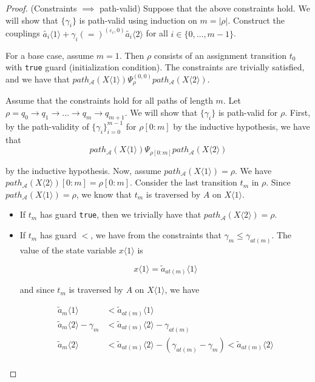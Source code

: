 \documentclass{article}
\renewcommand{\epsilon}{\varepsilon}
\newcommand{\1}{\langle 1 \rangle}
\newcommand{\2}{\langle 2 \rangle}
\begin{document}
\begin{proof}
    (Constraints $\implies$ path-valid) Suppose that the above constraints hold. We will show that $\{\gamma_i\}$ is path-valid using induction on $m = |\rho|$. Construct the couplings $\tilde{a_i} \1 + \gamma_i (=)^{(\epsilon_i, 0)} \tilde{a_i} \2$ for all $i \in \{0, \dots, m - 1\}$. 

    For a base case, assume $m = 1$. Then $\rho$ consists of an assignment transition $t_0$ with \texttt{true} guard (initialization condition). The constraints are trivially satisfied, and we have that $path_{\mathcal{A}}(X \1 ) \Psi_\rho^{(0, 0)} path_{\mathcal{A}}(X \2)$.

    Assume that the constraints hold for all paths of length $m$. Let $\rho = q_0 \to q_1 \to \dots \to q_{m} \to q_{m + 1}$. We will show that $\{\gamma_i\}$ is path-valid for $\rho$. First, by the path-validity of $\{\gamma_i\}_{i = 0}^{m - 1}$ for $\rho[0:m]$ by the inductive hypothesis, we have that \[path_{\mathcal{A}}(X \1) \Psi_{\rho[0:m]} path_{\mathcal{A}}(X \2)\] 
    
    by the inductive hypothesis. Now, assume $path_{\mathcal{A}}(X \1) = \rho$. We have $path_{\mathcal{A}}(X \2)[0:m] = \rho[0:m]$. Consider the last transition $t_{m}$ in $\rho$. Since $path_{\mathcal{A}}(X \1) = \rho$, we know that $t_m$ is traversed by $A$ on $X \1$.

    \begin{itemize}
        \item If $t_{m}$ has guard \texttt{true}, then we trivially have that $path_{\mathcal{A}}(X \2) = \rho$.
        \item If $t_{m}$ has guard $<$, we have from the constraints that $\gamma_{m} \leq \gamma_{at(m)}$. The value of the state variable $x \langle 1 \rangle$ is 
        
        \[x \1 = \tilde{a}_{at(m)} \1 \]

        and since $t_m$ is traversed by $A$ on $X \1$, we have 

        \begin{align*}
            \tilde{a}_{m} \1 &< \tilde{a}_{at(m)} \1\\
            \tilde{a}_{m} \2 - \gamma_m &< \tilde{a}_{at(m)} \2 - \gamma_{at(m)}\\
            \tilde{a}_{m} \2 &< \tilde{a}_{at(m)} \2 - (\gamma_{at(m)} - \gamma_{m}) < \tilde{a}_{at(m)} \2\\
        \end{align*}


\end{itemize}
\end{proof}
\end{document}
